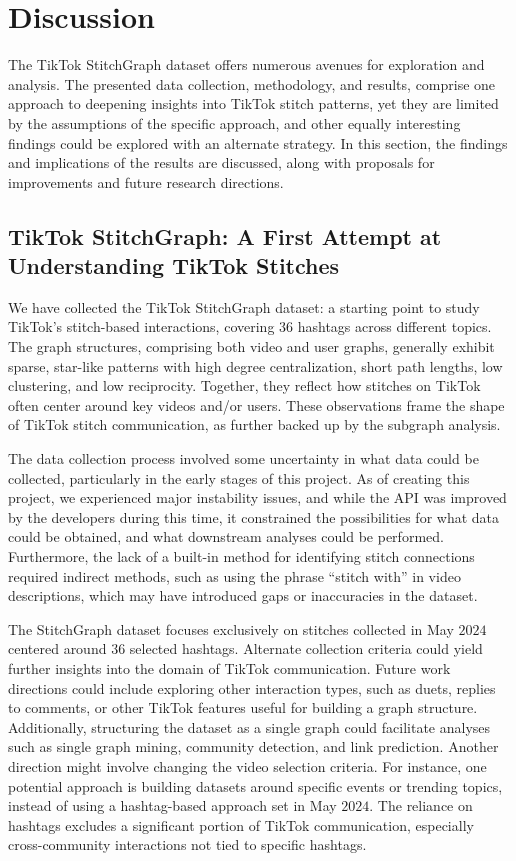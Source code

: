 \chapter{Discussion}
The TikTok StitchGraph dataset offers numerous avenues for exploration and analysis. The presented data collection, methodology, and results, comprise one approach to deepening insights into TikTok stitch patterns, yet they are limited by the assumptions of the specific approach, and other equally interesting findings could be explored with an alternate strategy. In this section, the findings and implications of the results are discussed, along with proposals for improvements and future research directions.


\section{TikTok StitchGraph: A First Attempt at Understanding TikTok Stitches}

We have collected the TikTok StitchGraph dataset: a starting point to study TikTok’s stitch-based interactions, covering $36$ hashtags across different topics. The graph structures, comprising both video and user graphs, generally exhibit sparse, star-like patterns with high degree centralization, short path lengths, low clustering, and low reciprocity. Together, they reflect how stitches on TikTok often center around key videos and/or users. These observations frame the shape of TikTok stitch communication, as further backed up by the subgraph analysis. 

The data collection process involved some uncertainty in what data could be collected, particularly in the early stages of this project. As of creating this project, we experienced major instability issues, and while the API was improved by the developers during this time, it constrained the possibilities for what data could be obtained, and what downstream analyses could be performed. 
Furthermore, the lack of a built-in method for identifying stitch connections required indirect methods, such as using the phrase “stitch with” in video descriptions, which may have introduced gaps or inaccuracies in the dataset. 

The StitchGraph dataset focuses exclusively on stitches collected in May $2024$ centered around $36$ selected hashtags. Alternate collection criteria could yield further insights into the domain of TikTok communication. Future work directions could include exploring other interaction types, such as duets, replies to comments, or other TikTok features useful for building a graph structure. Additionally, structuring the dataset as a single graph could facilitate analyses such as single graph mining, community detection, and link prediction. Another direction might involve changing the video selection criteria. For instance, one potential approach is building datasets around specific events or trending topics, instead of using a hashtag-based approach set in May $2024$. The reliance on hashtags excludes a significant portion of TikTok communication, especially cross-community interactions not tied to specific hashtags.
    
